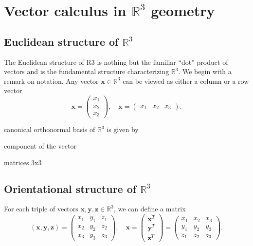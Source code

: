 \chapter{Vector calculus in $\mathbb{R}^3$ geometry}

\section{Euclidean structure of $\mathbb{R}^3$}

The Euclidean structure of R3 is nothing but the familiar “dot” product of vectors and is the fundamental structure characterizing \(\mathbb{R}^3\). We begin with a remark on notation. Any vector \(\mathbf{x} \in \mathbb{R}^3\) can be viewed as either a column or a row vector
\[
    \mathbf{x} = \begin{pmatrix}
        x_1 \\
        x_2 \\
        x_3
    \end{pmatrix}, \quad \mathbf{x} = \begin{pmatrix}
        x_1 & x_2 & x_3
    \end{pmatrix}.
\]

canonical orthonormal basis of \(\mathbb{R}^3\) is given by

component of the vector

matrices 3x3

\section{Orientational structure of \(\mathbb{R}^3\)}

For each triple of vectors \(\mathbf{x}, \mathbf{y}, \mathbf{z} \in \mathbb{R}^3\), we can define a matrix
\[
    (\mathbf{x}, \mathbf{y}, \mathbf{z}) = \begin{pmatrix}
        x_1 & y_1 & z_1 \\
        x_2 & y_2 & z_2 \\
        x_3 & y_3 & z_3
    \end{pmatrix}, \quad \mathbf{x} = \begin{pmatrix}
        \textbf{x}^T \\
        \textbf{y}^T \\
        \mathbf{z}^T
    \end{pmatrix}= \begin{pmatrix}
        x_1 & x_2 & x_3 \\
        y_1 & y_2 & y_3 \\
        z_1 & z_2 & z_3
    \end{pmatrix}.
\]

